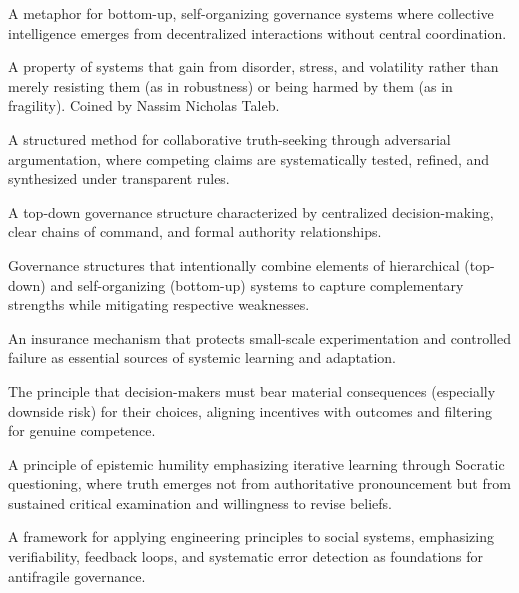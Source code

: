 \documentclass[11pt,a4paper]{article}
\begin{document}
\begin{description}[style=nextline, leftmargin=0pt, labelindent=0pt, font=\normalfont\bfseries]
    \item[Anthill] A metaphor for bottom-up, self-organizing governance systems where collective intelligence emerges from decentralized interactions without central coordination.
    
    \item[Antifragility] A property of systems that gain from disorder, stress, and volatility rather than merely resisting them (as in robustness) or being harmed by them (as in fragility). Coined by Nassim Nicholas Taleb.
    
    \item[Epistemological Boxing Protocol] A structured method for collaborative truth-seeking through adversarial argumentation, where competing claims are systematically tested, refined, and synthesized under transparent rules.
    
    \item[Hierarchy] A top-down governance structure characterized by centralized decision-making, clear chains of command, and formal authority relationships.
    
    \item[Hybrid Models] Governance structures that intentionally combine elements of hierarchical (top-down) and self-organizing (bottom-up) systems to capture complementary strengths while mitigating respective weaknesses.
    
    \item[Right to Neat Chaos] An insurance mechanism that protects small-scale experimentation and controlled failure as essential sources of systemic learning and adaptation.
    
    \item[Skin in the Game] The principle that decision-makers must bear material consequences (especially downside risk) for their choices, aligning incentives with outcomes and filtering for genuine competence.
    
    \item[Socratic Tail] A principle of epistemic humility emphasizing iterative learning through Socratic questioning, where truth emerges not from authoritative pronouncement but from sustained critical examination and willingness to revise beliefs.
    
    \item[SVE (Systemic Verification Engineering)] A framework for applying engineering principles to social systems, emphasizing verifiability, feedback loops, and systematic error detection as foundations for antifragile governance.
    

\end{description}
\end{document}
